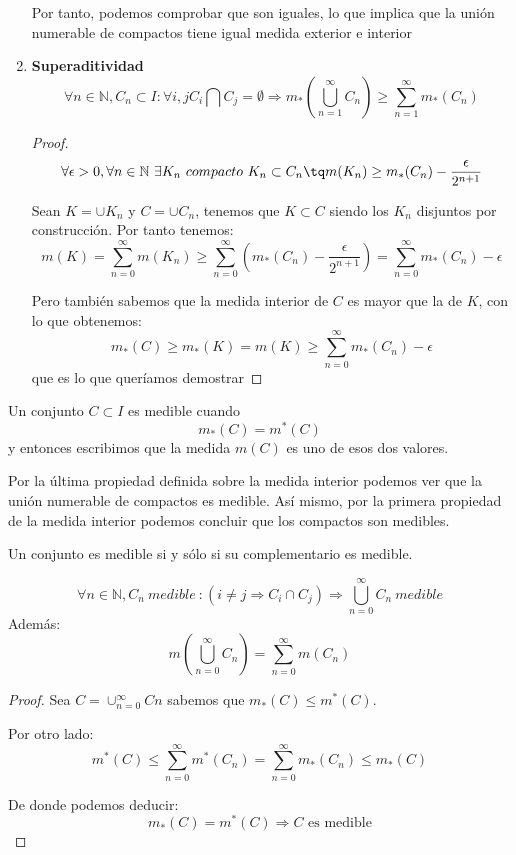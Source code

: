\documentclass{apuntes}
\begin{document}
\begin{enumerate}
Por tanto, podemos comprobar que son iguales, lo que implica que la unión numerable de compactos tiene igual medida exterior e interior

%
\item \textbf{Superaditividad}
\[\forall n \in \mathbb{N}, C_n \subset I : \forall i,j C_i \bigcap C_j = \emptyset \Rightarrow m_*(\bigcup_{n=1}^{\infty} C_n) \geq \sum_{n=1}^{\infty}m_*(C_n)\]

\begin{proof}
\[ \forall \epsilon > 0, \forall n \in \mathbb{N} \ \exists K_n \ compacto \ K_n \subset C_n \tq m(K_n) \geq m_*(C_n) - \frac{\epsilon}{2^{n+1}}\]

Sean $K=\cup K_n$ y $C=\cup C_n$, tenemos que $K\subset C$  siendo los $K_n$ disjuntos por construcción. Por tanto tenemos:
\[m(K) = \sum _{n=0}^{\infty}m(K_n) \geq \sum _{n=0}^{\infty}(m_*(C_n)- \frac{\epsilon}{2^{n+1}}) = \sum_{n=0}^{\infty} m_*(C_n) - \epsilon\]

Pero también sabemos que la medida interior de $C$ es mayor que la de $K$, con lo que obtenemos:
\[m_*(C) \geq m_*(K) = m(K) \geq \sum_{n=0}^{\infty} m_*(C_n) - \epsilon\]
que es lo que queríamos demostrar
\end{proof}
\end{enumerate}

\begin{defn}[Medibilidad]
Un conjunto $C \subset I$ es medible cuando
\[m_*(C)=m^*(C)\]
y entonces escribimos que la medida $m(C)$ es uno de esos dos valores.
\end{defn}

Por la última propiedad definida sobre la medida interior podemos ver que la unión numerable de compactos es medible. Así mismo, por la primera propiedad de la medida interior podemos concluir que los compactos son medibles.

\obs Un conjunto es medible si y sólo si su complementario es medible.

\begin{prop}
\[\forall n \in \mathbb{N}, C_n \ medible \ : (i \neq j \Rightarrow C_i \cap C_j) \Rightarrow \bigcup_{n=0}^{\infty} C_n \ medible\]
Además:
\[m(\bigcup_{n=0}^{\infty}C_n) = \sum_{n=0}^{\infty} m(C_n)\]
\end{prop}
\begin{proof}
Sea $C=\cup_{n=0}^{\infty} Cn$  sabemos que $m_*(C) \leq m^*(C)$.

Por otro lado:
\[m^*(C) \leq \sum_{n=0}^{\infty}m^*(C_n) = \sum_{n=0}^{\infty}m_*(C_n) \leq m_*(C) \]

De donde podemos deducir:
\[m_*(C) = m^*(C) \Rightarrow C \text{ es  medible} \]
\end{proof}
\end{document}
